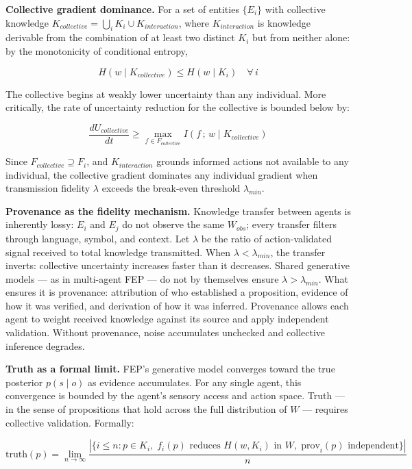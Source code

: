 \documentclass[
]{article}
\begin{document}
\textbf{Collective gradient dominance.} For a set of entities
\(\{E_i\}\) with collective knowledge
\(K_{collective} = \bigcup_i K_i \cup K_{interaction}\), where
\(K_{interaction}\) is knowledge derivable from the combination of at
least two distinct \(K_i\) but from neither alone: by the monotonicity
of conditional entropy,

\[H(w \mid K_{collective}) \leq H(w \mid K_i) \quad \forall\, i\]

The collective begins at weakly lower uncertainty than any individual.
More critically, the rate of uncertainty reduction for the collective is
bounded below by:

\[\frac{dU_{collective}}{dt} \geq \max_{f \in F_{collective}} I(f\,;\,w \mid K_{collective})\]

Since \(F_{collective} \supseteq F_i\), and \(K_{interaction}\) grounds
informed actions not available to any individual, the collective
gradient dominates any individual gradient when transmission fidelity
\(\lambda\) exceeds the break-even threshold \(\lambda_{min}\).

\textbf{Provenance as the fidelity mechanism.} Knowledge transfer
between agents is inherently lossy: \(E_i\) and \(E_j\) do not observe
the same \(W_{obs}\); every transfer filters through language, symbol,
and context. Let \(\lambda\) be the ratio of action-validated signal
received to total knowledge transmitted. When
\(\lambda < \lambda_{min}\), the transfer inverts: collective
uncertainty increases faster than it decreases. Shared generative models
--- as in multi-agent FEP --- do not by themselves ensure
\(\lambda > \lambda_{min}\). What ensures it is provenance: attribution
of who established a proposition, evidence of how it was verified, and
derivation of how it was inferred. Provenance allows each agent to
weight received knowledge against its source and apply independent
validation. Without provenance, noise accumulates unchecked and
collective inference degrades.

\textbf{Truth as a formal limit.} FEP's generative model converges
toward the true posterior \(p(s \mid o)\) as evidence accumulates. For
any single agent, this convergence is bounded by the agent's sensory
access and action space. Truth --- in the sense of propositions that
hold across the full distribution of \(W\) --- requires collective
validation. Formally:

\[\text{truth}(p) = \lim_{n \to \infty} \frac{\left|\{i \leq n : p \in K_i,\;
f_i(p) \text{ reduces } H(w, K_i) \text{ in } W,\; \text{prov}_i(p) \text{ independent}\}\right|}{n}\]
\end{document}

